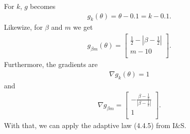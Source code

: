 \documentclass[]{article}
\begin{document}
For $k$, $g$ becomes
\begin{equation}\begin{aligned}
g_k(\theta) = \theta - 0.1 = k - 0.1.
\end{aligned}\end{equation}
Likewize, for $\beta$ and $m$ we get
\begin{equation}\begin{aligned}
g_{\beta m}(\theta) =
\begin{bmatrix}
\frac{1}{2} - |\beta - \frac{1}{2}|\\
m - 10\\
\end{bmatrix}.
\end{aligned}\end{equation}
Furthermore, the gradients are
\begin{equation}\begin{aligned}
\nabla g_k(\theta) = 1
\end{aligned}\end{equation}
and
\begin{equation}\begin{aligned}
\nabla g_{\beta m} =
\begin{bmatrix}
-\frac{\beta - \frac{1}{2}}{|\beta - \frac{1}{2}|}\\
1\\
\end{bmatrix}.
\end{aligned}\end{equation}
With that, we can apply the adaptive law (4.4.5) from I\&S.
\end{document}

